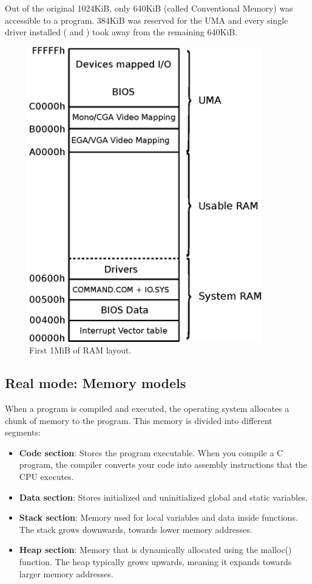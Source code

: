 \documentclass[book.tex]{subfiles}
\begin{document}
\bigskip
Out of the original 1024KiB, only 640KiB (called Conventional Memory) was accessible to a program. 384KiB was reserved for the UMA and every single driver installed ( and ) took away from the remaining 640KiB.\\

\par
\begin{figure}[H]
\centering
\includegraphics[width=0.9\textwidth]{imgs/drawings/real_mode_v2.eps}
\caption{First 1MiB of RAM layout.} 
\label{fig:fp_internals}
\end{figure}
\pagebreak

\subsection{Real mode: Memory models}
When a program is compiled and executed, the operating system allocates a chunk of memory to the program. This memory is divided into different segments:
\begin{itemize}
  \item \textbf{Code section}: Stores the program executable. When you compile a C program, the compiler converts your code into assembly instructions that the CPU executes.
  \item \textbf{Data section}: Stores initialized and uninitialized global and static variables.
  \item \textbf{Stack section}: Memory used for local variables and data inside functions. The stack grows downwards, towards lower memory addresses.
  \item \textbf{Heap section}: Memory that is dynamically allocated using the malloc() function. The heap typically grows upwards, meaning it expands towards larger memory addresses.
\end{itemize}
\end{document}
